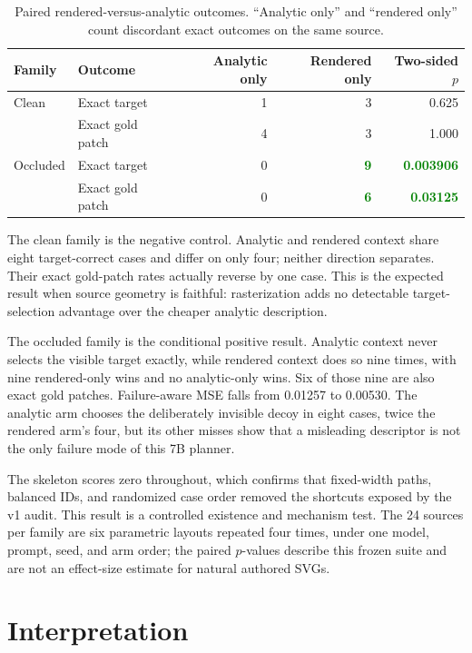 \documentclass[10pt,a4paper]{article}
\newcommand{\good}[1]{\textcolor{green}{\textbf{#1}}}
\begin{document}
\begin{table}[H]
\centering
\caption{Paired rendered-versus-analytic outcomes. ``Analytic only'' and
``rendered only'' count discordant exact outcomes on the same source.}
\begin{tabular}{@{}llrrr@{}}
\toprule
\textbf{Family} & \textbf{Outcome} & \textbf{Analytic only} &
\textbf{Rendered only} & \textbf{Two-sided \(p\)}\\
\midrule
Clean & Exact target & 1 & 3 & 0.625\\
 & Exact gold patch & 4 & 3 & 1.000\\
\addlinespace
Occluded & Exact target & 0 & \good{9} & \good{0.003906}\\
 & Exact gold patch & 0 & \good{6} & \good{0.03125}\\
\bottomrule
\end{tabular}
\end{table}

The clean family is the negative control. Analytic and rendered context share
eight target-correct cases and differ on only four; neither direction
separates. Their exact gold-patch rates actually reverse by one case. This is
the expected result when source geometry is faithful: rasterization adds no
detectable target-selection advantage over the cheaper analytic description.

The occluded family is the conditional positive result. Analytic context never
selects the visible target exactly, while rendered context does so nine times,
with nine rendered-only wins and no analytic-only wins. Six of those nine are
also exact gold patches. Failure-aware MSE falls from 0.01257 to 0.00530. The
analytic arm chooses the deliberately invisible decoy in eight cases, twice
the rendered arm's four, but its other misses show that a misleading
descriptor is not the only failure mode of this 7B planner.

The skeleton scores zero throughout, which confirms that fixed-width paths,
balanced IDs, and randomized case order removed the shortcuts exposed by the
v1 audit. This result is a controlled existence and mechanism test. The 24
sources per family are six parametric layouts repeated four times, under one
model, prompt, seed, and arm order; the paired \(p\)-values describe this
frozen suite and are not an effect-size estimate for natural authored SVGs.

\section{Interpretation}
\end{document}

